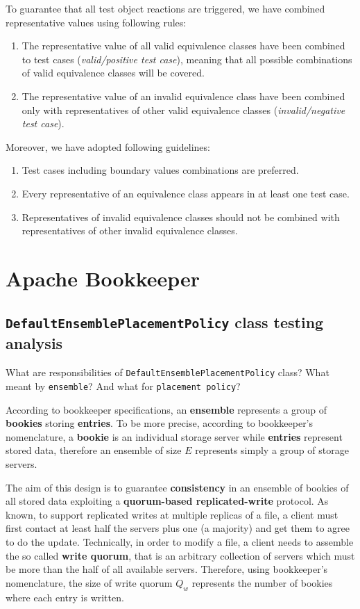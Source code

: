 \documentclass[sigconf]{acmart}
\begin{document}
To guarantee that all test object reactions are triggered, we have combined representative values using following rules:
\begin{enumerate}
\item The representative value of all valid equivalence classes have been combined to test cases (\textit{valid/positive test case}), meaning that all possible combinations of valid equivalence classes will be covered. 
\item The representative value of an invalid equivalence class have been combined only with representatives of other valid equivalence classes (\textit{invalid/negative test case}).
\end{enumerate}

Moreover, we have adopted following guidelines\cite{FoundationSoftwareTesting}:

\begin{enumerate}
\item Test cases including boundary values combinations are preferred.
\item Every representative of an equivalence class appears in at least one test case.
\item Representatives of invalid equivalence classes should not be combined with representatives of other invalid equivalence classes.
\end{enumerate}

\section{Apache Bookkeeper\texttrademark}
\subsection{\texttt{DefaultEnsemblePlacementPolicy} class testing analysis}

What are responsibilities of \texttt{DefaultEnsemblePlacementPolicy} class? What meant by \texttt{ensemble}? And what for \texttt{placement policy}?

According to bookkeeper specifications\cite{BookKeeperArchitecture}, an \textbf{ensemble} represents a group of \textbf{bookies} storing \textbf{entries}. To be more precise, according to bookkeeper's nomenclature, a \textbf{bookie} is an individual storage server while \textbf{entries} represent stored data, therefore an ensemble of size $E$ represents simply a group of storage servers.

The aim of this design is to guarantee \textbf{consistency} in an ensemble of bookies of all stored data exploiting a \textbf{quorum-based replicated-write} protocol. As known, to support replicated writes at multiple replicas of a file, a client must first contact at least half the servers plus one (a majority) and get them to agree to do the update\cite{Tanenbaum}. Technically, in order to modify a file, a client needs to assemble the so called \textbf{write quorum}, that is an arbitrary collection of servers which must be more than the half of all available servers\cite{Tanenbaum}. Therefore, using bookkeeper's nomenclature, the size of write quorum $Q_w$ represents the number of bookies where each entry is written. 
\end{document}

